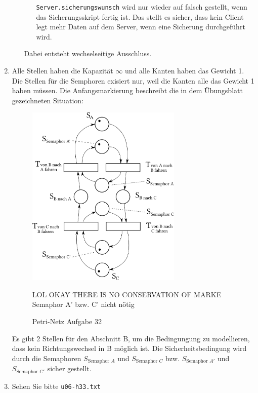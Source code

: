 \begin{enumerate}[label={Aufgabe H\arabic*},start=31]
\begin{enumerate}
\begin{itemize}
                    \texttt{Server.sicherungswunsch} wird nur wieder auf falsch gestellt, wenn das Sicherungsskript fertig ist. Das stellt es sicher, dass kein Client legt mehr Daten auf dem Server, wenn eine Sicherung durchgeführt wird. 
                \end{itemize}

                Dabei entsteht wechselseitige Ausschluss.
        \end{enumerate}
    \item Alle Stellen haben die Kapazität $\infty$ und alle Kanten haben das Gewicht 1. Die Stellen für die Semphoren exisiert nur, weil die Kanten alle das Gewicht 1 haben müssen. Die Anfangsmarkierung beschreibt die in dem Übungsblatt gezeichneten Situation:

        \vspace{2em}

        \begin{figure}[h!]
            \centering
            \includegraphics[width=0.7\textwidth]{q32.eps}
            \caption{Petri-Netz Aufgabe 32}

            LOL OKAY THERE IS NO CONSERVATION OF MARKE Semaphor A' bzw. C' nicht nötig
        \end{figure}

        Es gibt 2 Stellen für den Abschnitt B, um die Bedingungung zu modellieren, dass kein Richtungswechsel in B möglich ist. Die Sicherheitsbedingung wird durch die Semaphoren $S_{\text{Semaphor } A}$ und $S_{\text{Semaphor } C}$ bzw. $S_{\text{Semaphor } A'}$ und $S_{\text{Semaphor } C'}$ sicher gestellt. 
    \item Sehen Sie bitte \texttt{u06-h33.txt}
\end{enumerate}
